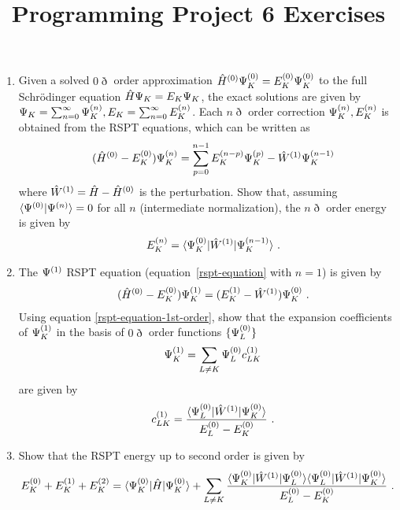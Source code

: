 \documentclass[fleqn,11pt]{article}
\title{Programming Project 6 Exercises}
\author{}
\date{}
\begin{document}
\maketitle

\begin{enumerate}
  \item
  Given a solved $0\eth$ order approximation $\hat{H}^{(0)}\Psi_K^{(0)}=E_K^{(0)}\Psi_K^{(0)}$ to the full Schr\"odinger equation $\hat{H}\Psi_K=E_K\Psi_K$, the exact solutions are given by $\Psi_K=\sum_{n=0}^{\infty}\Psi_K^{(n)}, E_K=\sum_{n=0}^{\infty}E_K^{(n)}$.
Each $n\eth$ order correction $\Psi_K^{(n)}, E_K^{(n)}$ is obtained from the RSPT equations, which can be written as
\begin{align}
\label{rspt-equation}
&&
  (\hat{H}^{(0)}-E_K^{(0)})\Psi^{(n)}_K
=
  \sum_{p=0}^{n-1}E^{(n-p)}_K\Psi^{(p)}_K
-
  \hat{W}^{(1)}\Psi^{(n-1)}_K
\end{align}
where $\hat{W}^{(1)}=\hat{H}-\hat{H}^{(0)}$ is the perturbation.
Show that, assuming $\langle\Psi^{(0)}|\Psi^{(n)}\rangle=0$ for all $n$ (intermediate normalization), the $n\eth$ order energy is given by
\begin{align}
&&
  E^{(n)}_K
=
  \langle\Psi^{(0)}_K|\hat{W}^{(1)}|\Psi^{(n-1)}_K\rangle\ .
\end{align}


\item The $\Psi^{(1)}$ RSPT equation (equation~\ref{rspt-equation} with $n=1$) is given by
\begin{align}
\label{rspt-equation-1st-order}
&&
  (\hat{H}^{(0)}-E_K^{(0)})\Psi_K^{(1)}
=
  (E_K^{(1)}-\hat{W}^{(1)})\Psi_K^{(0)}\ .
\end{align}
Using equation \ref{rspt-equation-1st-order}, show that the expansion coefficients of $\Psi_K^{(1)}$ in the basis of $0\eth$ order functions $\{\Psi_L^{(0)}\}$
\begin{align*}
&&
  \Psi_K^{(1)}
=
  \sum_{L\neq K}
  \Psi_L^{(0)} c_{LK}^{(1)}
\end{align*}
are given by
\begin{align}
&&
  c_{LK}\ord{1}
=
  \fr{\ip{\Y_L\ord{0}|\op{W}\ord{1}|\Y_K\ord{0}}}{E_L\ord{0}-E_K\ord{0}}\ .
\end{align}

\item Show that the RSPT energy up to second order is given by
\begin{align}
  E_K\ord{0}
+
  E_K\ord{1}
+
  E_K\ord{2}
=
  \ip{\Y_K\ord{0}|\op{H}|\Y_K\ord{0}}
+
  \sum_{L\neq K}
  \fr{\ip{\Y_K\ord{0}|\op{W}\ord{1}|\Y_L\ord{0}}\ip{\Y_L\ord{0}|\op{W}\ord{1}|\Y_K\ord{0}}}{E_L\ord{0}-E_K\ord{0}}\ .
\end{align}


\end{enumerate}
\end{document}
